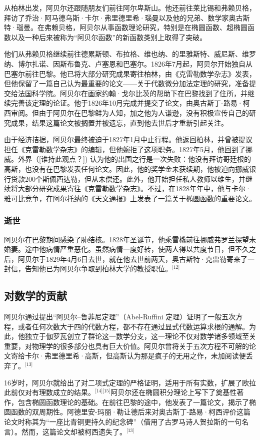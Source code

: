 从柏林出发，阿贝尔还跟随朋友们前往阿尔卑斯山。他还前往莱比锡和弗赖贝格，拜访了乔治·阿马德乌斯·卡尔·弗里德里希·瑙曼以及他的兄弟、数学家奥古斯特·瑙曼。在弗赖贝格，阿贝尔从事函数理论研究，特别是在椭圆函数、超椭圆函数以及一种后来被称为“阿贝尔函数”的新函数类别上取得了突破。

他们从弗赖贝格继续前往德累斯顿、布拉格、维也纳、的里雅斯特、威尼斯、维罗纳、博尔扎诺、因斯布鲁克、卢塞恩和巴塞尔。1826年7月起，阿贝尔开始独自从巴塞尔前往巴黎。他已将大部分研究成果寄往柏林，由《克雷勒数学杂志》发表，但他保留了一篇自己认为最重要的论文——关于代数微分加法定理的研究，准备提交给法国科学院。阿贝尔在画家约翰·戈尔比茨的帮助下在巴黎找到了住所，并继续完善该定理的论证。他于1826年10月完成并提交了论文，由奥古斯丁-路易·柯西审阅。但由于阿贝尔在巴黎鲜为人知，加之他为人谦逊，没有积极宣传自己的研究成果，结果这篇论文被搁置并被遗忘，直到他去世后才重新引起关注。

由于经济拮据，阿贝尔最终被迫于1827年1月中止行程。他返回柏林，并曾被提议担任《克雷勒数学杂志》的编辑，但他婉拒了这项职务。1827年5月，他回到了挪威。外界（[谁持此观点？]) 认为他的出国之行是一次失败：他没有拜访哥廷根的高斯，也没有在巴黎发表任何论文。因此，他的奖学金未获续期，他被迫向挪威银行贷款200个斯佩西达勒，但从未偿还。此外，他开始担任私人教师以维生，并继续将大部分研究成果寄往《克雷勒数学杂志》。不过，在1828年年中，他与卡尔·雅可比竞争，在阿尔托纳的《天文通报》上发表了一篇关于椭圆函数的重要论文。
\subsubsection{逝世}
阿贝尔在巴黎期间感染了肺结核。1828年圣诞节，他乘雪橇前往挪威弗罗兰探望未婚妻。途中他病情严重恶化。虽然病情一度好转，使两人得以共度节日，但不久之后，阿贝尔于1829年4月6日去世，就在他去世前两天，奥古斯特·克雷勒寄来了一封信，告知他已为阿贝尔争取到柏林大学的教授职位。\(^\text{[12]}\)
\subsection{对数学的贡献}
阿贝尔通过提出“阿贝尔–鲁菲尼定理”（Abel-Ruffini 定理）证明了一般五次方程，或者任何次数大于四的代数方程，都不存在通过显式代数运算求根的通解。为此，他独立于伽罗瓦创立了群论这一数学分支，这一理论不仅对数学诸多领域至关重要，对物理学的很多部分也具有巨大价值。阿贝尔曾将关于五次方程不可解的论文寄给卡尔·弗里德里希·高斯，但高斯认为那是疯子的无用之作，未加阅读便丢弃了。\(^\text{[13]}\)

16岁时，阿贝尔就给出了对二项式定理的严格证明，适用于所有实数，扩展了欧拉此前仅对有理数成立的结果。\(^\text{[14][15]}\)阿贝尔还在椭圆积分理论上写下了奠基性著作，包含椭圆函数理论的基础。在前往巴黎的途中，他发表了一篇论文，揭示了椭圆函数的双周期性。阿德里安-玛丽·勒让德后来对奥古斯丁-路易·柯西评价这篇论文时称其为“一座比青铜更持久的纪念碑”（借用了古罗马诗人贺拉斯的一句名言）。然而，这篇论文却被柯西遗失了。\(^\text{[13]}\)

